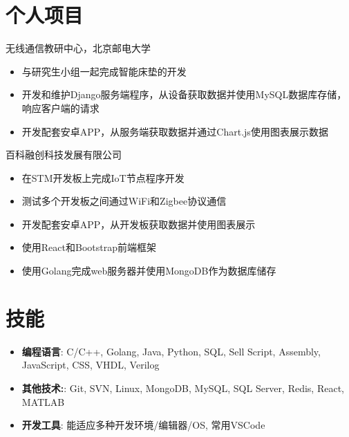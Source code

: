\documentclass{resume}
\begin{document}
\vspace{6pt}

\section{个人项目}
无线通信教研中心，北京邮电大学
\begin{itemize}[parsep=0.25ex]
    \item 与研究生小组一起完成智能床垫的开发
    \item 开发和维护Django服务端程序，从设备获取数据并使用MySQL数据库存储，响应客户端的请求
    \item 开发配套安卓APP，从服务端获取数据并通过Chart.js使用图表展示数据
\end{itemize}
百科融创科技发展有限公司
\begin{itemize}[parsep=0.25ex]
    \item 在STM开发板上完成IoT节点程序开发
    \item 测试多个开发板之间通过WiFi和Zigbee协议通信
    \item 开发配套安卓APP，从开发板获取数据并使用图表展示
\end{itemize}
\begin{itemize}[parsep=0.25ex]
    \item 使用React和Bootstrap前端框架
    \item 使用Golang完成web服务器并使用MongoDB作为数据库储存
\end{itemize}

\vspace{6pt}

\section{技能}
\begin{itemize}[parsep=0.25ex]
    \item
          \textbf{编程语言}:
          C/C++, Golang, Java, Python, SQL, Sell Script, Assembly, JavaScript, CSS, VHDL, Verilog
    \item
          \textbf{其他技术:}:
          Git, SVN, Linux, MongoDB, MySQL, SQL Server, Redis, React, MATLAB
    \item
          \textbf{开发工具}:
          能适应多种开发环境/编辑器/OS, 常用VSCode
\end{itemize}
\end{document}
